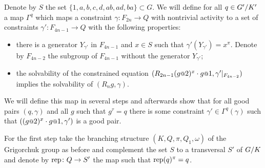 \documentclass[a4paper,11pt]{amsart}
\begin{document}
Denote by $S$ the set $\{1,a,b,c,d,ab,ad,ba\}\subset G$.
We will define for all $q\in {G'/K'}$ a map $\Gamma^q$ which maps a constraint
$\gamma\colon F_{2n} \to Q$ with nontrivial activity to a set of constraints $\gamma'\colon F_{4n-1}\to Q$ 
with the following properties:
\begin{itemize}
  \item there is a generator $Y_{\gamma'}$ in $F_{4n-1}$ and $x\in S$ such that $\gamma'(Y_{\gamma'})=x^\pi$.
    Denote by $F_{4n-2}$ the subgroup of $F_{4n-1}$ without the generator $Y_{\gamma'}$;
  \item the solvability of the constrained equation $(R_{2n-1} (g\at{2})^x \cdot g\at{1},\gamma'|_{F_{4n-2}})$
  implies the solvability of $(R_ng,\gamma)$.
 \end{itemize}

 We will define this map in several steps and afterwards show that for all good 
 pairs $(q,\gamma)$ and all $g$ such that $g^\tau=q$ there is some constraint 
 $\gamma' \in \Gamma^q(\gamma)$ such that $((g\at{2})^x \cdot g\at{1},\gamma')$ is a good pair.
 
 For the first step take the branching structure $(K,Q,\pi,Q_1,\omega)$ of the 
 Grigorchuk group as before and complement the set $S$ to a transversal $S'$ 
 of ${G/K}$ and denote by $\textup{rep}\colon Q\to S'$  the map such that 
 $\textup{rep}(q)^\pi = q$.
 
\end{document}
